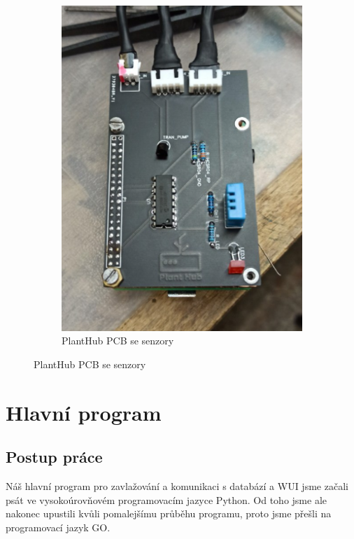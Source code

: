 \documentclass[11pt,a4paper]{article}
\begin{document}
\begin{figure}[h]
\begin{subfigure}[b]{0.4\linewidth}
		\includegraphics[width=\linewidth]{planthub.png}
		\caption{PlantHub PCB se senzory}
	\end{subfigure}
\end{figure}

\clearpage

\section{Hlavní program}

\subsection{Postup práce}

Náš hlavní program pro zavlažování a komunikaci s databází a WUI
jsme začali psát ve vysokoúrovňovém programovacím jazyce Python. Od toho jsme
ale nakonec upustili kvůli pomalejšímu průběhu programu, proto jsme přešli na
programovací jazyk GO.
\end{document}
